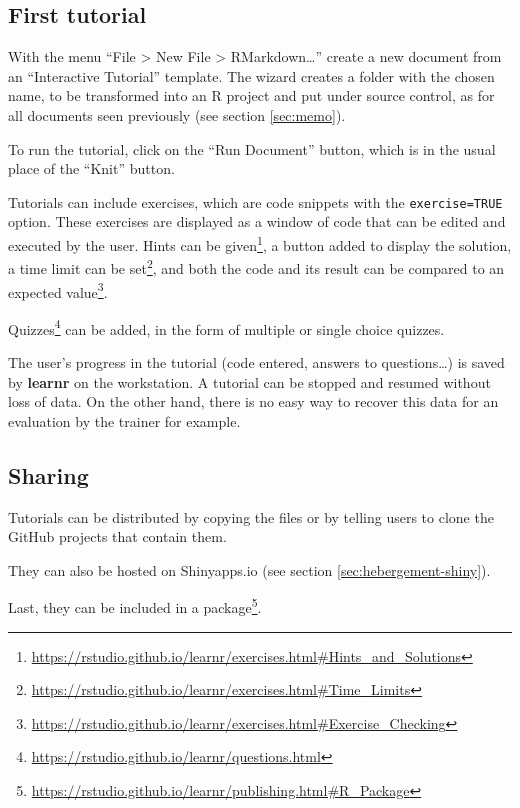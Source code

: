 \documentclass[
  12pt,
  american,
  a4paper,
  extrafontsizes,onecolumn,openright
  ]{memoir}
\begin{document}
\subsection{First tutorial}\label{first-tutorial}

With the menu \enquote{File \textgreater{} New File \textgreater{} RMarkdown\ldots{}} create a new document from an \enquote{Interactive Tutorial} template.
The wizard creates a folder with the chosen name, to be transformed into an R project and put under source control, as for all documents seen previously (see section \ref{sec:memo}).

To run the tutorial, click on the \enquote{Run Document} button, which is in the usual place of the \enquote{Knit} button.

Tutorials can include exercises, which are code snippets with the \texttt{exercise=TRUE} option.
These exercises are displayed as a window of code that can be edited and executed by the user.
Hints can be given\footnote{\url{https://rstudio.github.io/learnr/exercises.html\#Hints_and_Solutions}}, a button added to display the solution, a time limit can be set\footnote{\url{https://rstudio.github.io/learnr/exercises.html\#Time_Limits}}, and both the code and its result can be compared to an expected value\footnote{\url{https://rstudio.github.io/learnr/exercises.html\#Exercise_Checking}}.

Quizzes\footnote{\url{https://rstudio.github.io/learnr/questions.html}} can be added, in the form of multiple or single choice quizzes.

The user's progress in the tutorial (code entered, answers to questions\ldots) is saved by \textbf{learnr} on the workstation.
A tutorial can be stopped and resumed without loss of data.
On the other hand, there is no easy way to recover this data for an evaluation by the trainer for example.

\subsection{Sharing}\label{sharing}

Tutorials can be distributed by copying the files or by telling users to clone the GitHub projects that contain them.

They can also be hosted on Shinyapps.io (see section \ref{sec:hebergement-shiny}).

Last, they can be included in a package\footnote{\url{https://rstudio.github.io/learnr/publishing.html\#R_Package}}.
\end{document}
